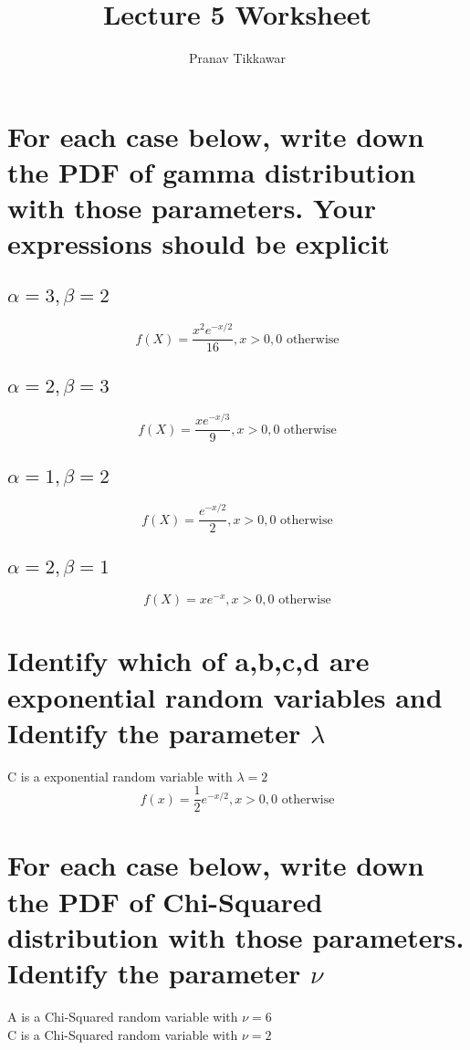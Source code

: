 \documentclass{article}
\author{Pranav Tikkawar}
\title{Lecture 5 Worksheet}
\begin{document}
\maketitle
\section{For each case below, write down the PDF of gamma distribution with those parameters. Your expressions should be explicit}

\subsection{$\alpha = 3, \beta = 2$}
$$f(X) = \frac{x^2 e^{-x/2}}{16}, x>0, 0 \text{ otherwise}$$
\subsection{$\alpha = 2, \beta = 3$}
$$f(X) = \frac{xe^{-x/3}}{9}, x>0, 0 \text{ otherwise}$$
\subsection{$\alpha = 1, \beta = 2$}
$$f(X) = \frac{e^{-x/2}}{2}, x>0, 0 \text{ otherwise}$$
\subsection{$\alpha = 2, \beta = 1$}
$$f(X) = xe^{-x}, x>0, 0 \text{ otherwise}$$

\section{Identify which of a,b,c,d are exponential random variables and Identify the parameter $\lambda$}
C is a exponential random variable with $\lambda = 2$\\
$$ f(x) = \frac{1}{2} e^{-x/2}, x>0, 0 \text{ otherwise}$$

\section{For each case below, write down the PDF of Chi-Squared distribution with those parameters. Identify the parameter $\nu$}
A is a Chi-Squared random variable with $\nu = 6$\\

C is a Chi-Squared random variable with $\nu = 2$\\
\end{document}
